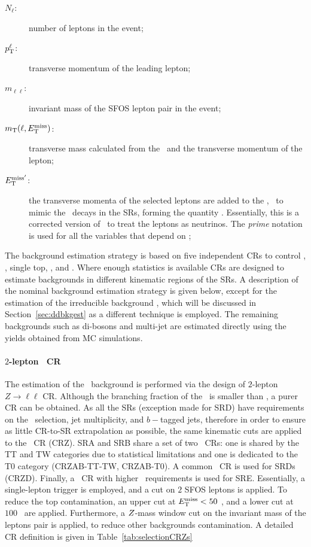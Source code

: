 		\begin{description}
			\item[\boldmath $N_{\ell}$:] number of leptons in the event;
			\item[\boldmath $p_{\mathrm{T}}^{\ell}$:] transverse momentum of the leading lepton;
			\item[\boldmath $m_{\ell\ell}$:] invariant mass of the \ac{SFOS} lepton pair in the event;
			\item[\boldmath $m_{\mathrm{T}}(\ell,E_{\mathrm{T}}^{\mathrm{miss}})$:] transverse mass calculated from the \met\ and the transverse momentum of the lepton;  
			\item[\boldmath $E_{\mathrm{T}}^{\mathrm{miss'}}$:] the transverse momenta of the selected leptons are added to the \ptmiss, \eg\ to mimic the \Znunu\ decays in the \acp{SR}, forming the quantity \metprime. Essentially, this is a corrected version of \met\ to treat the leptons as neutrinos. The \emph{prime} notation is used for all the variables that depend on \metprime;
		\end{description}

		The background estimation strategy is based on five independent \acp{CR} to control \Zjets, \ttbar, single top, \Wjets, and \ttZ. Where enough statistics is available \acp{CR} are designed to estimate backgrounds in different kinematic regions of the \acp{SR}. A description of the nominal background estimation strategy is given below, except for the estimation of the irreducible background \ttZ, which will be discussed in Section~\ref{sec:ddbkgest} as a different technique is employed. The remaining backgrounds such as di-bosons and multi-jet are estimated directly using the yields obtained from \ac{MC} simulations.


		\paragraph{$2$-lepton \Zjets\ CR}

			The estimation of the \Znunu\ background is performed via the design of $2$-lepton $Z \rightarrow \ell \ell$ \ac{CR}. Although the branching fraction of the \Zll\ is smaller than \Znunu, a purer \ac{CR} can be obtained. As all the \acp{SR} (exception made for SRD) have requirements on the \MET\ selection, jet multiplicity, and $b-$tagged jets, therefore in order to ensure as little \ac{CR}-to-\ac{SR} extrapolation as possible, the same kinematic cuts are applied to the \Zjets\ \ac{CR} (CRZ).  SRA and SRB share a set of two \Zboson\ \acp{CR}: one is shared by the TT and TW categories due to statistical limitations and one is dedicated to the T0 category (CRZAB-TT-TW, CRZAB-T0). A common \Zboson\ \ac{CR} is used for SRDs (CRZD). Finally, a \Zboson\ \ac{CR} with higher \HT\ requirements is used for SRE. Essentially, a single-lepton trigger is employed, and a cut on $2$ \ac{SFOS} leptons is applied. To reduce the top contamination, an upper cut at $E_{\mathrm{T}}^{\mathrm{miss}} < 50$ \GeV, and a lower cut at $100$ \GeV\ are applied. Furthermore, a $Z$-mass window cut on the invariant mass of the leptons pair is applied, to reduce other backgrounds contamination. A detailed \ac{CR} definition is given in Table~\ref{tab:selectionCRZs}


